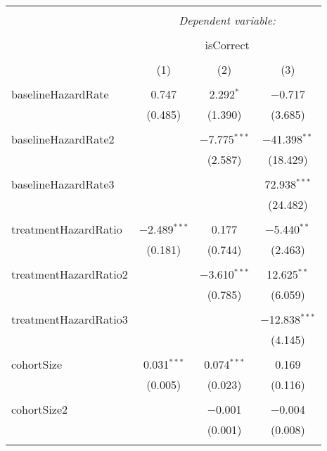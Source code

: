 
\begin{table}[!htbp] \centering 
  \caption{} 
  \label{} 
\begin{tabular}{@{\extracolsep{5pt}}lccc} 
\\[-1.8ex]\hline 
\hline \\[-1.8ex] 
 & \multicolumn{3}{c}{\textit{Dependent variable:}} \\ 
\cline{2-4} 
\\[-1.8ex] & \multicolumn{3}{c}{isCorrect} \\ 
\\[-1.8ex] & (1) & (2) & (3)\\ 
\hline \\[-1.8ex] 
 baselineHazardRate & 0.747 & 2.292$^{*}$ & $-$0.717 \\ 
  & (0.485) & (1.390) & (3.685) \\ 
  & & & \\ 
 baselineHazardRate2 &  & $-$7.775$^{***}$ & $-$41.398$^{**}$ \\ 
  &  & (2.587) & (18.429) \\ 
  & & & \\ 
 baselineHazardRate3 &  &  & 72.938$^{***}$ \\ 
  &  &  & (24.482) \\ 
  & & & \\ 
 treatmentHazardRatio & $-$2.489$^{***}$ & 0.177 & $-$5.440$^{**}$ \\ 
  & (0.181) & (0.744) & (2.463) \\ 
  & & & \\ 
 treatmentHazardRatio2 &  & $-$3.610$^{***}$ & 12.625$^{**}$ \\ 
  &  & (0.785) & (6.059) \\ 
  & & & \\ 
 treatmentHazardRatio3 &  &  & $-$12.838$^{***}$ \\ 
  &  &  & (4.145) \\ 
  & & & \\ 
 cohortSize & 0.031$^{***}$ & 0.074$^{***}$ & 0.169 \\ 
  & (0.005) & (0.023) & (0.116) \\ 
  & & & \\ 
 cohortSize2 &  & $-$0.001 & $-$0.004 \\ 
  &  & (0.001) & (0.008) \\ 
  & & & \\ 

\end{tabular}
\end{table}
